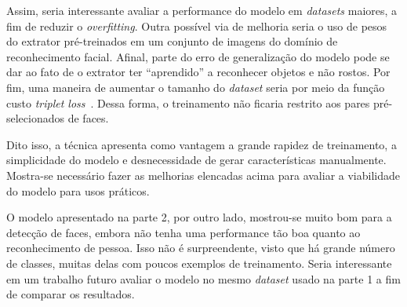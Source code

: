 \documentclass{bmvc2k}
\begin{document}
Assim, seria interessante avaliar a performance do modelo em \textit{datasets} maiores, a fim de reduzir o \textit{overfitting}. Outra possível via de melhoria seria o uso de pesos do extrator pré-treinados em um conjunto de imagens do domínio de reconhecimento facial. Afinal, parte do erro de generalização do modelo pode se dar ao fato de o extrator ter ``aprendido'' a reconhecer objetos e não rostos. Por fim, uma maneira de aumentar o tamanho do \textit{dataset} seria por meio da função custo \textit{triplet loss}~\cite{triplet}. Dessa forma, o treinamento não ficaria restrito aos pares pré-selecionados de faces.

Dito isso, a técnica apresenta como vantagem a grande rapidez de treinamento, a simplicidade do modelo e desnecessidade de gerar características manualmente. Mostra-se necessário fazer as melhorias elencadas acima para avaliar a viabilidade do modelo para usos práticos.

O modelo apresentado na parte 2, por outro lado, mostrou-se muito bom para a detecção de faces, embora não tenha uma performance tão boa quanto ao reconhecimento de pessoa. Isso não é surpreendente, visto que há grande número de classes, muitas delas com poucos exemplos de treinamento. Seria interessante em um trabalho futuro avaliar o modelo no mesmo \textit{dataset} usado na parte 1 a fim de comparar os resultados.



\end{document}
